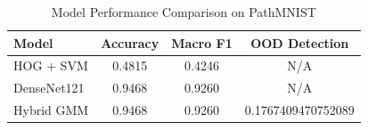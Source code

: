 \begin{table}[h]
\centering
\caption{Model Performance Comparison on PathMNIST}
\label{tab:comparison}
\begin{tabular}{lccc}
\toprule
Model & Accuracy & Macro F1 & OOD Detection \\
\midrule
HOG + SVM & 0.4815 & 0.4246 & N/A \\
DenseNet121 & 0.9468 & 0.9260 & N/A \\
Hybrid GMM & 0.9468 & 0.9260 & 0.1767409470752089 \\
\bottomrule
\end{tabular}
\end{table}